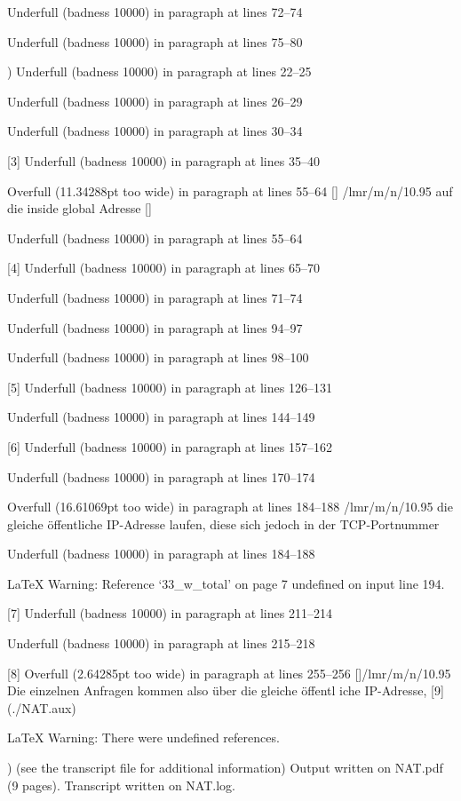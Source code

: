 Underfull \hbox (badness 10000) in paragraph at lines 72--74


Underfull \hbox (badness 10000) in paragraph at lines 75--80

)
Underfull \hbox (badness 10000) in paragraph at lines 22--25


Underfull \hbox (badness 10000) in paragraph at lines 26--29


Underfull \hbox (badness 10000) in paragraph at lines 30--34

[3]
Underfull \hbox (badness 10000) in paragraph at lines 35--40


Overfull \hbox (11.34288pt too wide) in paragraph at lines 55--64
[]  \TU/lmr/m/n/10.95 auf die inside global Adresse  []

Underfull \hbox (badness 10000) in paragraph at lines 55--64

[4]
Underfull \hbox (badness 10000) in paragraph at lines 65--70


Underfull \hbox (badness 10000) in paragraph at lines 71--74


Underfull \hbox (badness 10000) in paragraph at lines 94--97


Underfull \hbox (badness 10000) in paragraph at lines 98--100

[5]
Underfull \hbox (badness 10000) in paragraph at lines 126--131


Underfull \hbox (badness 10000) in paragraph at lines 144--149

[6]
Underfull \hbox (badness 10000) in paragraph at lines 157--162


Underfull \hbox (badness 10000) in paragraph at lines 170--174


Overfull \hbox (16.61069pt too wide) in paragraph at lines 184--188
\TU/lmr/m/n/10.95 die gleiche öffentliche IP-Adresse laufen, diese sich jedoch 
in der TCP-Portnummer

Underfull \hbox (badness 10000) in paragraph at lines 184--188


LaTeX Warning: Reference `33_w_total' on page 7 undefined on input line 194.

[7]
Underfull \hbox (badness 10000) in paragraph at lines 211--214


Underfull \hbox (badness 10000) in paragraph at lines 215--218

[8]
Overfull \hbox (2.64285pt too wide) in paragraph at lines 255--256
[]\TU/lmr/m/n/10.95 Die einzelnen Anfragen kommen also über die gleiche öffentl
iche IP-Adresse,
[9] (./NAT.aux)

LaTeX Warning: There were undefined references.

 )
(see the transcript file for additional information)
Output written on NAT.pdf (9 pages).
Transcript written on NAT.log.

